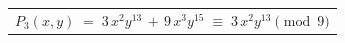 \documentclass[12pt,border=4pt]{standalone}
\begin{document}
\color[HTML]{1F2A3A}
\begin{tabular}{@{}c@{}}$\displaystyle P_3(x,y)\;=\;3\,x^{2}y^{13}\,+\,9\,x^{3}y^{15}\;\equiv\;3\,x^{2}y^{13}\pmod 9$\end{tabular}
\end{document}
